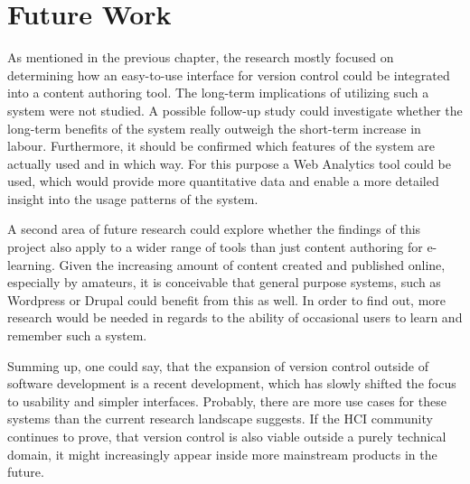 \chapter{Future Work} \label{chapter:future-work}
As mentioned in the previous chapter, the research mostly focused on determining how an easy-to-use interface for version control could be integrated into a content authoring tool. The long-term implications of utilizing such a system were not studied. A possible follow-up study could investigate whether the long-term benefits of the system really outweigh the short-term increase in labour. Furthermore, it should be confirmed which features of the system are actually used and in which way. For this purpose a Web Analytics tool could be used, which would provide more quantitative data and enable a more detailed insight into the usage patterns of the system.

A second area of future research could explore whether the findings of this project also apply to a wider range of tools than just content authoring for e-learning. Given the increasing amount of content created and published online, especially by amateurs, it is conceivable that general purpose systems, such as Wordpress \cite{_wordpress_????} or Drupal \cite{_drupal_????} could benefit from this as well. In order to find out, more research would be needed in regards to the ability of occasional users to learn and remember such a system.

Summing up, one could say, that the expansion of version control outside of software development is a recent development, which has slowly shifted the focus to usability and simpler interfaces. Probably, there are more use cases for these systems than the current research landscape suggests. If the HCI community continues to prove, that version control is also viable outside a purely technical domain, it might increasingly appear inside more mainstream products in the future.










